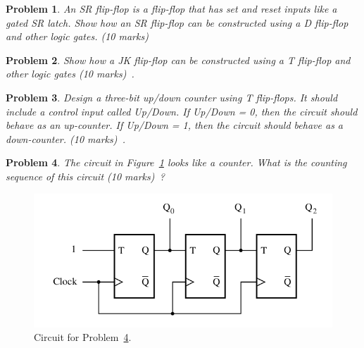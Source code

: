\documentclass[twocolumn]{article}
\newtheorem{prob}{Problem}
\begin{document}

\begin{prob}
  An SR flip-flop is a flip-flop that has set and reset inputs like a gated SR
latch. Show how an SR flip-flop can be constructed using a D flip-flop and other
logic gates. (10 marks)~\cite[Prob 5.5]{brown2013fundamentals}
\end{prob}

\begin{prob}
  Show how a JK flip-flop can be constructed using a T flip-flop and other logic
  gates (10 marks)~\cite[Prob 5.7]{brown2013fundamentals}.
\end{prob}

\begin{prob}
  Design a three-bit up/down counter using T flip-flops. It should include a control input
  called Up/Down. If Up/Down = 0, then the circuit should behave as an up-counter. If
  Up/Down = 1, then the circuit should behave as a down-counter. 
  (10 marks)~\cite[Prob 5.15]{brown2013fundamentals}.
\end{prob}

\begin{prob}
  The circuit in Figure~\ref{fig:p5.3} looks like a counter. What is the
  counting sequence of this circuit (10 marks)~\cite[Prob 5.17]{brown2013fundamentals}?
  \label{prob:6}
\end{prob}
\begin{figure}[ht!]
  \includegraphics[width=\linewidth]{fig-p5.3.png}
  \caption{Circuit for Problem~\ref{prob:6}.}
    \label{fig:p5.3}
\end{figure}
\end{document}
